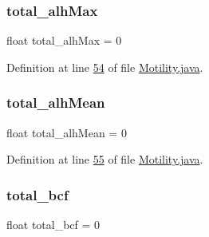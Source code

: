 \hypertarget{classanalysis_1_1_motility_a35f4543589a6af76e2ba8e813e9c8d15}{}\label{classanalysis_1_1_motility_a35f4543589a6af76e2ba8e813e9c8d15} 
\subsubsection{\texorpdfstring{total\+\_\+alh\+Max}{total\_alhMax}}
{\footnotesize\ttfamily float total\+\_\+alh\+Max = 0\hspace{0.3cm}{\ttfamily [private]}}



Definition at line \hyperlink{_motility_8java_source_l00054}{54} of file \hyperlink{_motility_8java_source}{Motility.\+java}.

\hypertarget{classanalysis_1_1_motility_a85064380da24660107d26a563b17e002}{}\label{classanalysis_1_1_motility_a85064380da24660107d26a563b17e002} 
\subsubsection{\texorpdfstring{total\+\_\+alh\+Mean}{total\_alhMean}}
{\footnotesize\ttfamily float total\+\_\+alh\+Mean = 0\hspace{0.3cm}{\ttfamily [private]}}



Definition at line \hyperlink{_motility_8java_source_l00055}{55} of file \hyperlink{_motility_8java_source}{Motility.\+java}.

\hypertarget{classanalysis_1_1_motility_aa42afc6b771762a4c51d2ac098050a2c}{}\label{classanalysis_1_1_motility_aa42afc6b771762a4c51d2ac098050a2c} 
\subsubsection{\texorpdfstring{total\+\_\+bcf}{total\_bcf}}
{\footnotesize\ttfamily float total\+\_\+bcf = 0\hspace{0.3cm}{\ttfamily [private]}}



